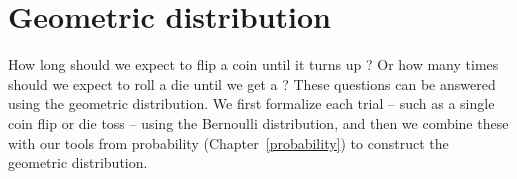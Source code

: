 %
%
%
%




\section{Geometric distribution}
\label{geomDist}

How long should we expect to flip a coin until it turns up ? Or how many times should we expect to roll a die until we get a ? These questions can be answered using the geometric distribution. We first formalize each trial -- such as a single coin flip or die toss -- using the Bernoulli distribution, and then we combine these with our tools from probability (Chapter~\ref{probability}) to construct the geometric distribution.

